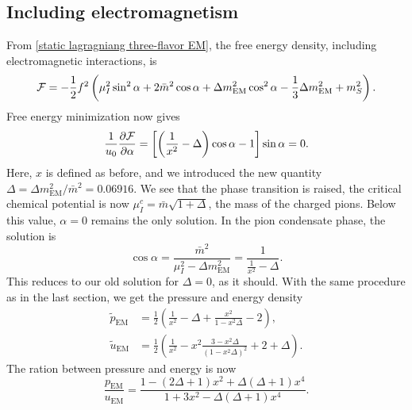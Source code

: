\subsection{Including electromagnetism}
\label{subsection: including electromagnetism lo eos}


From \autoref{static lagragniang three-flavor EM}, the free energy density, including electromagnetic interactions, is
%
\begin{equation}
    \mathcal{F} =
    - \frac{1}{2} f^2
    \left(
        \mu_I^2 \sin^2\alpha + 2 \bar m^2\cos\alpha 
        + \Delta m_\text{EM}^2\cos^2\alpha
        - \frac{1}{3}\Delta m_\text{EM}^2 + m_S^2
    \right).
\end{equation}
%
Free energy minimization now gives
%
\begin{equation}
    \frac{1}{u_0}\pdv{\mathcal{F}}{\alpha}
    = 
    \left[ \left( \frac{1}{x^2} - \Delta \right) \cos \alpha - 1\right] \sin \alpha = 0.
\end{equation}
%
Here, $x$ is defined as before, and we introduced the new quantity $\Delta = \Delta m_{\text{EM}}^2 / \bar m^2= 0.06916$.
We see that the phase transition is raised, the critical chemical potential is now $\mu_I^c = \bar m \sqrt{1 + \Delta}$, the mass of the charged pions.
Below this value, $\alpha = 0$ remains the only solution.
In the pion condensate phase, the solution is
%
\begin{equation}
    \cos \alpha = \frac{\bar m^2}{\mu_I^2 - \Delta m_\text{EM}^2}
    = \frac{1}{\frac{1}{x^2} -  \Delta}.
\end{equation}
%
This reduces to our old solution for $\Delta = 0$, as it should.
With the same procedure as in the last section, we get the pressure and energy density
%
\begin{align}
    \label{pressure with em interaction}
    \tilde p_\text{EM}
    & = \frac{1}{2} 
    \left(
        \frac{1}{x^2} - \Delta
        + \frac{x^2}{1 - x^2 \Delta} 
        - 2 
    \right), \\
    \tilde u_\text{EM}
    &= \frac{1}{2} 
    \left(
        \frac{1}{x^2} 
        - x^2 \frac{3 - x^2 \Delta }{(1 - x^2 \Delta)^2}
        + 2 + \Delta
    \right).
\end{align}
%
The ration between pressure and energy is now
%
\begin{equation}
    \frac{p_\text{EM}}{u_\text{EM}} 
    = 
    \frac{
        1 - (2\Delta + 1)x^2 + \Delta(\Delta + 1)x^4
        }{
        1 + 3x^2 - \Delta (\Delta +1)x^4
        }.
\end{equation}

